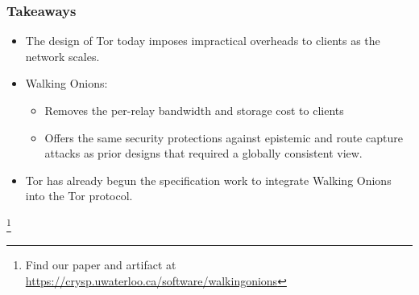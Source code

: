 \documentclass[hyperref={pdfpagelabels=true},table,dvipsnames,14pt,aspectratio=169]{beamer}
\begin{document}
\begin{frame}
\frametitle{Takeaways}
  \begin{itemize}
  \setlength\itemsep{2ex}
    \item<1-> The design of Tor today imposes impractical overheads to clients as
      the network scales.
    \item<2-> Walking Onions:
      \begin{itemize}
        \item<3-> Removes the per-relay bandwidth and storage cost to clients
        \item<4-> Offers the same security protections against epistemic
      and route capture attacks as prior designs that required a globally
      consistent view.
      \end{itemize}
    \item<5-> Tor has already begun the specification work to
    integrate Walking Onions into the Tor protocol.
  \end{itemize}

      \let\thefootnote\relax\footnote{
      Find our paper and artifact at \url{https://crysp.uwaterloo.ca/software/walkingonions}
      }
\end{frame}
\end{document}
